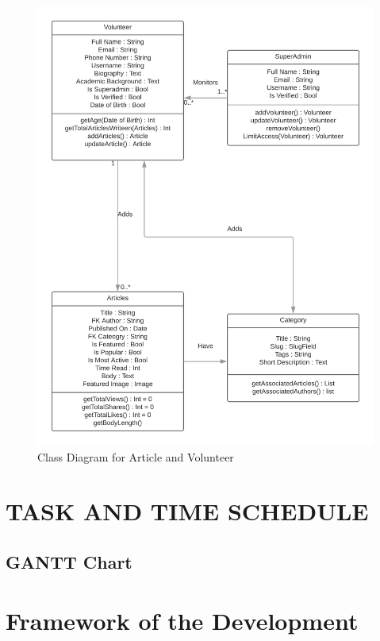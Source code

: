 \documentclass[12pt, a4paper, titlepage]{article}
\begin{document}
\begin{center}
\begin{figure}
\includegraphics[scale=0.5]{Class_Diagram_for_Election_Portal_2.png}
	\caption{Class Diagram for Article and Volunteer}
\end{figure}
\end{center}

\section{TASK AND TIME SCHEDULE}
\subsection{GANTT Chart }
\newpage

\section{Framework of the Development}
\end{document}
